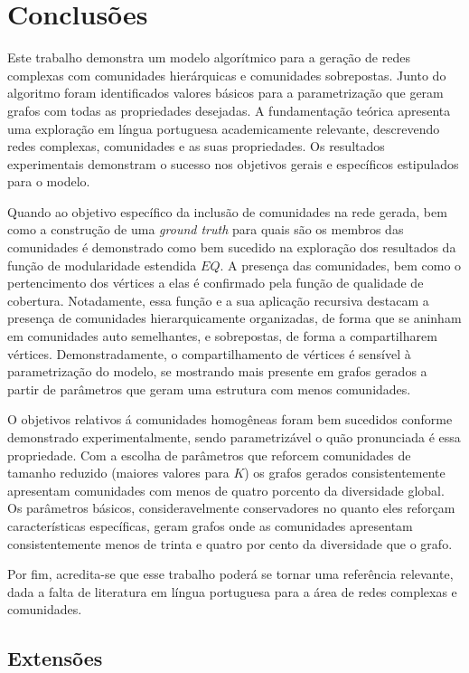 \documentclass[notes.tex]{subfiles}
\begin{document}
\chapter{Conclusões}

Este trabalho demonstra um modelo algorítmico para a geração de redes complexas com comunidades hierárquicas e comunidades sobrepostas.
Junto do algoritmo foram identificados valores básicos para a parametrização que geram grafos com todas as propriedades desejadas.
A fundamentação teórica apresenta uma exploração em língua portuguesa academicamente relevante, descrevendo redes complexas, comunidades e as suas propriedades.
Os resultados experimentais demonstram o sucesso nos objetivos gerais e específicos estipulados para o modelo.

Quando ao objetivo específico da inclusão de comunidades na rede gerada, bem como a construção de uma \emph{ground truth} para quais são os membros das comunidades é demonstrado como bem sucedido na exploração dos resultados da função de modularidade estendida $EQ$.
A presença das comunidades, bem como o pertencimento dos vértices a elas é confirmado pela função de qualidade de cobertura.
Notadamente, essa função e a sua aplicação recursiva destacam a presença de comunidades hierarquicamente organizadas, de forma que se aninham em comunidades auto semelhantes, e sobrepostas, de forma a compartilharem vértices.
Demonstradamente, o compartilhamento de vértices é sensível à parametrização do modelo, se mostrando mais presente em grafos gerados a partir de parâmetros que geram uma estrutura com menos comunidades.

O objetivos relativos á comunidades homogêneas foram bem sucedidos conforme demonstrado experimentalmente, sendo parametrizável o quão pronunciada é essa propriedade.
Com a escolha de parâmetros que reforcem comunidades de tamanho reduzido (maiores valores para $K$) os grafos gerados consistentemente apresentam comunidades com menos de quatro porcento da diversidade global.
Os parâmetros básicos, consideravelmente conservadores no quanto eles reforçam características específicas, geram grafos onde as comunidades apresentam consistentemente menos de trinta e quatro por cento da diversidade que o grafo.

Por fim, acredita-se que esse trabalho poderá se tornar uma referência relevante, dada a falta de literatura em língua portuguesa para a área de redes complexas e comunidades.

\section{Extensões}
\end{document}
